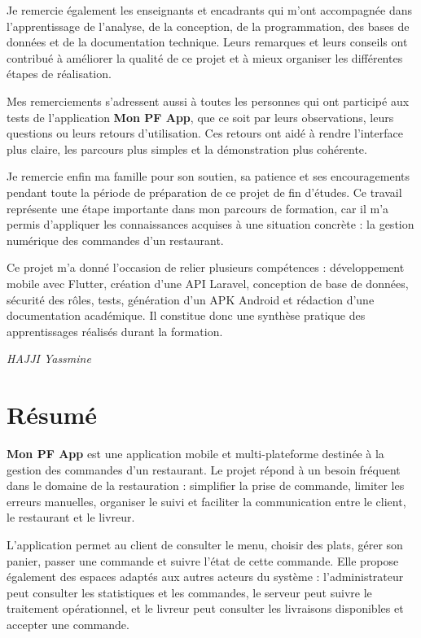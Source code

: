 \documentclass[12pt,a4paper]{report}
\begin{document}
Je remercie également les enseignants et encadrants qui m'ont accompagnée dans l'apprentissage de l'analyse, de la conception, de la programmation, des bases de données et de la documentation technique. Leurs remarques et leurs conseils ont contribué à améliorer la qualité de ce projet et à mieux organiser les différentes étapes de réalisation.

Mes remerciements s'adressent aussi à toutes les personnes qui ont participé aux tests de l'application \textbf{Mon PF App}, que ce soit par leurs observations, leurs questions ou leurs retours d'utilisation. Ces retours ont aidé à rendre l'interface plus claire, les parcours plus simples et la démonstration plus cohérente.

Je remercie enfin ma famille pour son soutien, sa patience et ses encouragements pendant toute la période de préparation de ce projet de fin d'études. Ce travail représente une étape importante dans mon parcours de formation, car il m'a permis d'appliquer les connaissances acquises à une situation concrète : la gestion numérique des commandes d'un restaurant.

Ce projet m'a donné l'occasion de relier plusieurs compétences : développement mobile avec Flutter, création d'une API Laravel, conception de base de données, sécurité des rôles, tests, génération d'un APK Android et rédaction d'une documentation académique. Il constitue donc une synthèse pratique des apprentissages réalisés durant la formation.

\vfill
\begin{flushright}
\textit{HAJJI Yassmine}
\end{flushright}

\chapter*{Résumé}
\vspace*{0.7cm}
\textbf{Mon PF App} est une application mobile et multi-plateforme destinée à la gestion des commandes d'un restaurant. Le projet répond à un besoin fréquent dans le domaine de la restauration : simplifier la prise de commande, limiter les erreurs manuelles, organiser le suivi et faciliter la communication entre le client, le restaurant et le livreur.

L'application permet au client de consulter le menu, choisir des plats, gérer son panier, passer une commande et suivre l'état de cette commande. Elle propose également des espaces adaptés aux autres acteurs du système : l'administrateur peut consulter les statistiques et les commandes, le serveur peut suivre le traitement opérationnel, et le livreur peut consulter les livraisons disponibles et accepter une commande.
\end{document}
